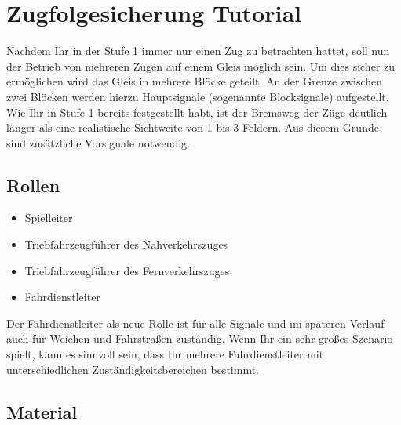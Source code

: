 

\section{Zugfolgesicherung Tutorial}

Nachdem Ihr in der Stufe 1 immer nur einen Zug zu betrachten hattet, soll nun der Betrieb von mehreren Zügen auf einem Gleis möglich sein. Um dies sicher zu ermöglichen wird das Gleis in mehrere Blöcke geteilt. An der Grenze zwischen zwei Blöcken werden hierzu Hauptsignale (sogenannte Blocksignale) aufgestellt. Wie Ihr in Stufe 1 bereits festgestellt habt, ist der Bremsweg der Züge deutlich länger als eine realistische Sichtweite von 1 bis 3 Feldern. Aus diesem Grunde sind zusätzliche Vorsignale notwendig.

\subsection*{Rollen}

  \begin{itemize}
    \item Spielleiter
    \item Triebfahrzeugführer des Nahverkehrszuges
    \item Triebfahrzeugführer des Fernverkehrszuges
    \item Fahrdienstleiter
  \end{itemize}

  Der Fahrdienstleiter als neue Rolle ist für alle Signale und im späteren Verlauf auch für Weichen und Fahrstraßen zuständig. Wenn Ihr ein sehr großes Szenario spielt, kann es sinnvoll sein, dass Ihr mehrere Fahrdienstleiter mit unterschiedlichen Zuständigkeitsbereichen bestimmt.

\subsection*{Material}


